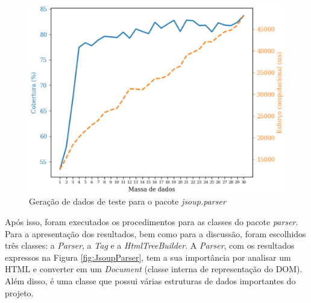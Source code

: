 \begin{figure}[H]
	\centering
	\includegraphics[scale=0.6]{figuras/jsoup.parser_generation.eps}
	\caption{Geração de dados de teste para o pacote \textit{jsoup.parser}}
	\label{fig:genJsoup}
\end{figure}

Após isso, foram executados os procedimentos para as classes do pacote \textit{parser}. Para a apresentação dos resultados, bem como para a discussão, foram escolhidos três classes: a \textit{Parser}, a \textit{Tag} e a \textit{HtmlTreeBuilder}. A \textit{Parser}, com os resultados expressos na Figura \ref{fig:JsoupParser}, tem a sua importância por analisar um HTML e converter em um \textit{Document} (classe interna de representação do DOM). Além disso, é uma classe que possui várias estruturas de dados importantes do projeto. 

